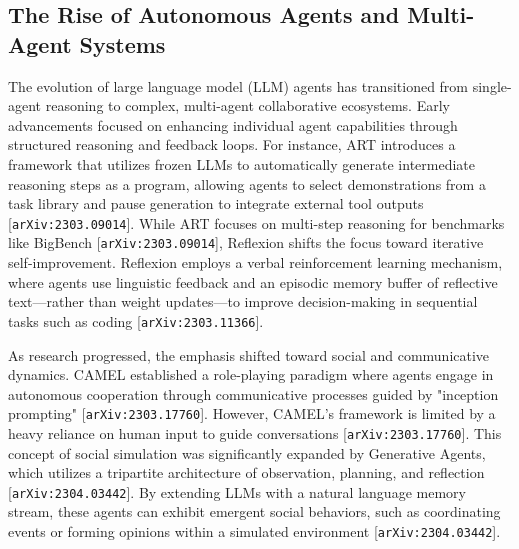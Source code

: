 \documentclass[11pt]{article}
\begin{document}
\subsection{The Rise of Autonomous Agents and Multi-Agent Systems}

The evolution of large language model (LLM) agents has transitioned from single-agent reasoning to complex, multi-agent collaborative ecosystems. Early advancements focused on enhancing individual agent capabilities through structured reasoning and feedback loops. For instance, ART introduces a framework that utilizes frozen LLMs to automatically generate intermediate reasoning steps as a program, allowing agents to select demonstrations from a task library and pause generation to integrate external tool outputs [\texttt{arXiv:2303.09014}]. While ART focuses on multi-step reasoning for benchmarks like BigBench [\texttt{arXiv:2303.09014}], Reflexion shifts the focus toward iterative self-improvement. Reflexion employs a verbal reinforcement learning mechanism, where agents use linguistic feedback and an episodic memory buffer of reflective text—rather than weight updates—to improve decision-making in sequential tasks such as coding [\texttt{arXiv:2303.11366}].

As research progressed, the emphasis shifted toward social and communicative dynamics. CAMEL established a role-playing paradigm where agents engage in autonomous cooperation through communicative processes guided by "inception prompting" [\texttt{arXiv:2303.17760}]. However, CAMEL's framework is limited by a heavy reliance on human input to guide conversations [\texttt{arXiv:2303.17760}]. This concept of social simulation was significantly expanded by Generative Agents, which utilizes a tripartite architecture of observation, planning, and reflection [\texttt{arXiv:2304.03442}]. By extending LLMs with a natural language memory stream, these agents can exhibit emergent social behaviors, such as coordinating events or forming opinions within a simulated environment [\texttt{arXiv:2304.03442}].
\end{document}
